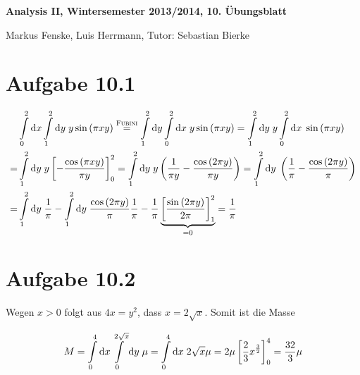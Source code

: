 \documentclass[a4paper,german,12pt,smallheadings]{scrartcl}
\begin{document}
\begin{center}
\bfseries %
\sffamily %
\vspace{-40pt}
Analysis II, Wintersemester 2013/2014, 10. Übungsblatt

Markus Fenske, Luis Herrmann, Tutor: Sebastian Bierke
\vspace{-10pt}
\end{center}
\allowdisplaybreaks %
\section*{Aufgabe 10.1}
\begin{align*}
  & \int\limits_0^2 \dif x \int\limits_1^2 \dif y \; y \sin\del{\pi x y} \overset{\text{\textsc{Fubini}}}{=}
    \int\limits_1^2 \dif y \int\limits_0^2 \dif x \; y \sin\del{\pi x y} =
    \int\limits_1^2 \dif y \; y \int\limits_0^2 \dif x \; \sin\del{\pi x y} \\ =
  & \int\limits_1^2 \dif y \; y \sbr{- \frac{\cos\del{\pi x y}}{\pi y}}_0^2 =
    \int\limits_1^2 \dif y \; y \del{\frac{1}{\pi y} - \frac{\cos\del{2 \pi y}}{\pi y}} =
    \int\limits_1^2 \dif y \; \del{\frac{1}{\pi} - \frac{\cos\del{2 \pi y}}{\pi}} \\ =
  & \int\limits_1^2 \dif y \; \frac{1}{\pi} - \int\limits_1^2 \dif y \; \frac{\cos\del{2 \pi y}}{\pi}
    \frac{1}{\pi} - \frac{1}{\pi} \underbrace{\sbr{\frac{\sin\del{2 \pi y}}{2 \pi}}_1^2}_{=0} = \frac{1}{\pi}
\end{align*}

\section*{Aufgabe 10.2}
Wegen $x > 0$ folgt aus $4x = y^2$, dass $x = 2 \sqrt{x}$. Somit ist die Masse

\begin{align*}
  M
  = \int\limits_0^4 \dif x \int\limits_0^{2 \sqrt{x}} \dif y \; \mu
  = \int\limits_0^4 \dif x \; 2 \sqrt{x} \mu
  = 2 \mu \sbr{\frac{2}{3} x^\frac{3}{2}}_0^4
  = \frac{32}{3} \mu
\end{align*}
\end{document}
